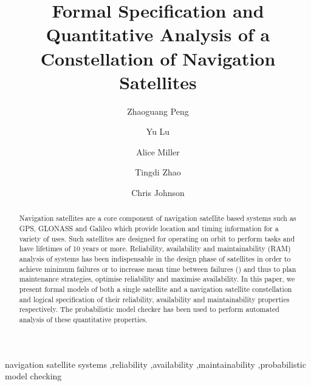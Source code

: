 \documentclass[preprint,12pt]{qrei}
\begin{document}
\begin{frontmatter}





\title{Formal Specification and Quantitative Analysis of a Constellation of Navigation Satellites}

\author[label1,label3]{Zhaoguang Peng}
  \address[label1]{China Ceprei Laboratory, Guangzhou, China}
  \address[label2]{School of Computing Science, University of Glasgow, Glasgow, UK}
 \address[label3]{School of Reliability and Systems Engineering, Beijing University of Aeronautics and Astronautics, Beijing, China}
  \author[label2]{Yu Lu}
  \author[label2]{Alice Miller}
  \author[label3]{Tingdi Zhao}
  \author[label2]{Chris Johnson}






\begin{abstract}
Navigation satellites are a core component of navigation satellite based systems such as GPS, GLONASS and Galileo which provide location and timing information for a variety of uses. Such satellites are designed for operating on orbit to perform tasks and have lifetimes of 10 years or more. Reliability, availability and maintainability (RAM) analysis of systems has been indispensable in the design phase of satellites in order to achieve minimum failures or to increase mean time between failures () and thus to plan maintenance strategies, optimise reliability and maximise availability. In this paper, we present formal models of both a single satellite and a navigation satellite constellation and logical specification of their reliability, availability and maintainability properties respectively. The probabilistic model checker  has been used to perform automated analysis of these quantitative properties.
\end{abstract}

\begin{keyword}


navigation satellite systems \sep reliability \sep availability \sep maintainability \sep probabilistic model checking



\end{keyword}

\end{frontmatter}
\end{document}
